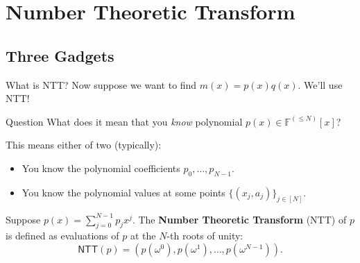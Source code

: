 \documentclass{zkdl-presentation-template}
\begin{document}
    \section{Number Theoretic Transform}

    \subsection{Three Gadgets}
    \begin{frame}{What is NTT?}
        Now suppose we want to find $m(x) = p(x)q(x)$. We'll use NTT!
        
        \begin{alertblock}{Question}
            What does it mean that you \emph{know} polynomial $p(x) \in \mathbb{F}^{(\leq N)}[x]$?
        \end{alertblock}

        This means either of two (typically):
        \begin{itemize}
            \item You know the polynomial coefficients $p_0,\dots,p_{N-1}$.
            \item You know the polynomial values at some points $\{(x_j,a_j)\}_{j \in [N]}$.
        \end{itemize}

        \begin{definition}[NTT]
            Suppose $p(x) = \sum_{j=0}^{N-1}p_jx^j$. The \textbf{Number Theoretic Transform} (NTT) of $p$ is defined as evaluations of $p$ at the $N$-th roots of unity:
            \begin{equation*}
                \mathsf{NTT}(p) = \left(p(\omega^0), p(\omega^1), \dots, p(\omega^{N-1})\right).
            \end{equation*}
        \end{definition}
    \end{frame}
\end{document}

